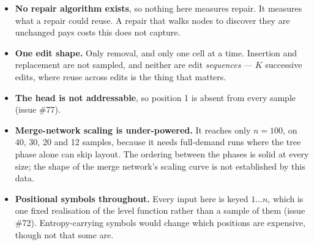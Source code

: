 \documentclass[11pt,a4paper]{article}
\begin{document}
\begin{itemize}\itemsep2pt
\item \textbf{No repair algorithm exists}, so nothing here measures repair. It
  measures what a repair could reuse. A repair that walks nodes to discover
  they are unchanged pays costs this does not capture.
\item \textbf{One edit shape.} Only removal, and only one cell at a time.
  Insertion and replacement are not sampled, and neither are edit
  \emph{sequences} --- $K$ successive edits, where reuse across edits is the
  thing that matters.
\item \textbf{The head is not addressable}, so position 1 is absent from every
  sample (issue \#77).
\item \textbf{Merge-network scaling is under-powered.} It reaches only
  $n=100$, on 40, 30, 20 and 12 samples, because it needs full-demand runs
  where the tree phase alone can skip layout. The ordering between the phases
  is solid at every size; the shape of the merge network's scaling curve is
  not established by this data.
\item \textbf{Positional symbols throughout.} Every input here is keyed
  $1 \ldots n$, which is one fixed realisation of the level function rather
  than a sample of them (issue \#72). Entropy-carrying symbols would change
  which positions are expensive, though not that some are.
\end{itemize}
\end{document}
